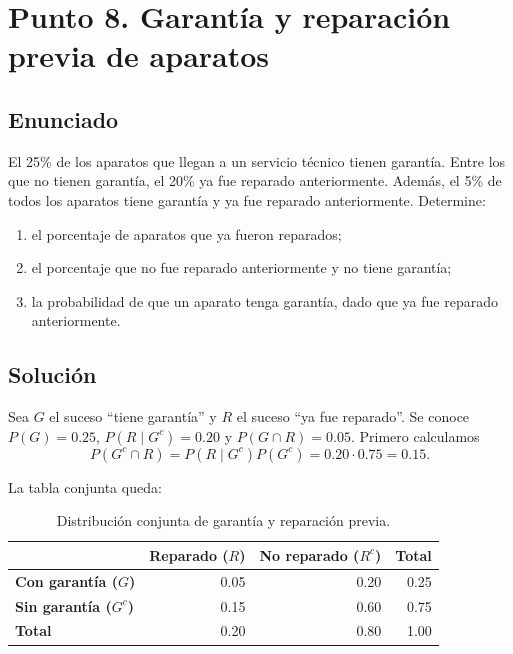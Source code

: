 \documentclass[12pt]{article}
\begin{document}
\section*{Punto 8. Garantía y reparación previa de aparatos}

\subsection*{Enunciado}

El 25\% de los aparatos que llegan a un servicio técnico tienen garantía. Entre los que no tienen garantía, el 20\% ya fue reparado anteriormente. Además, el 5\% de todos los aparatos tiene garantía y ya fue reparado anteriormente. Determine:

\begin{enumerate}
    \item el porcentaje de aparatos que ya fueron reparados;
    \item el porcentaje que no fue reparado anteriormente y no tiene garantía;
    \item la probabilidad de que un aparato tenga garantía, dado que ya fue reparado anteriormente.
\end{enumerate}

\subsection*{Solución}

Sea $G$ el suceso ``tiene garantía'' y $R$ el suceso ``ya fue reparado''. Se conoce $P(G)=0.25$, $P(R\mid G^c)=0.20$ y $P(G\cap R)=0.05$. Primero calculamos
\[
P(G^c\cap R)=P(R\mid G^c)P(G^c)=0.20\cdot0.75=0.15.
\]

La tabla conjunta queda:

\begin{table}[H]
\centering
\small
\renewcommand{\arraystretch}{1.15}
\begin{tabular}{|l|r|r|r|}
\hline
 & \textbf{Reparado ($R$)} & \textbf{No reparado ($R^c$)} & \textbf{Total} \\ \hline
\textbf{Con garantía ($G$)} & 0.05 & 0.20 & 0.25 \\ \hline
\textbf{Sin garantía ($G^c$)} & 0.15 & 0.60 & 0.75 \\ \hline
\textbf{Total} & 0.20 & 0.80 & 1.00 \\ \hline
\end{tabular}
\caption{Distribución conjunta de garantía y reparación previa.}
\label{tab:garantia-reparacion}
\end{table}
\end{document}
